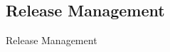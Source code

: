 \subsection{Release Management}
\begin{frame}{\insertsubsection  \mytitlesource{\sommerville}}
	\begin{fancycolumns}[animation=none]
		\begin{definition}{Release Management}
			
		\end{definition}\pause
		\nextcolumn
	\end{fancycolumns}
\end{frame}

